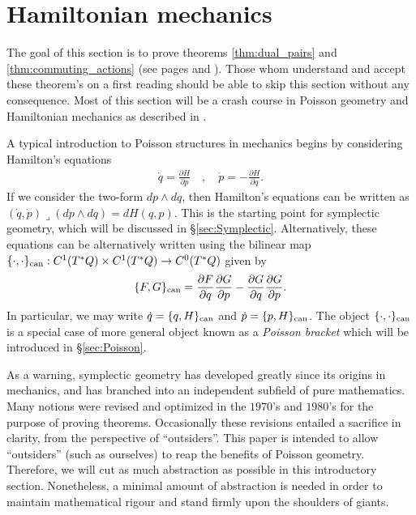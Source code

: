 \documentclass[12pt]{amsart}
\newcommand{\pder}[2]{\ensuremath{\frac{\partial #1}{\partial #2}}}
\begin{document}
\section{Hamiltonian mechanics}
\label{sec:Hamiltonian}
The goal of this section is to prove theorems \ref{thm:dual_pairs}
and \ref{thm:commuting_actions} (see pages \pageref{thm:dual_pairs} and \pageref{thm:commuting_actions}).
Those whom understand and accept these theorem's on a first reading
should be able to skip this section without any consequence.
Most of this section will be a crash course in Poisson geometry
and Hamiltonian mechanics as described in \cite{FOM,MandS,Weinstein1983}.

A typical introduction to Poisson structures in mechanics
begins by considering Hamilton's equations
\begin{align*}
  \dot{q} = \pder{H}{p} \quad, \quad  \dot{p} = - \pder{H}{q}.
\end{align*}
If we consider the two-form $dp \wedge dq$, then Hamilton's equations
can be written as $(\dot{q},\dot{p}) \lrcorner (dp \wedge dq) = dH(q,p)$.
This is the starting point for symplectic geometry, which
will be discussed in \S \ref{sec:Symplectic}.
Alternatively, these equations can be alternatively written using the bilinear map $\{ \cdot , \cdot \}_{\rm can} : C^1( T^*Q) \times C^1(T^*Q) \to C^0(T^*Q)$
given by
\begin{align*}
  \{ F , G \}_{\rm can} = \pder{F}{q}\pder{G}{p} - \pder{G}{q} \pder{G}{p}.
\end{align*}
In particular, we may write $\dot{q} = \{ q , H \}_{\rm can}$ and $\dot{p} = \{ p , H\}_{\rm can}$.
The object $\{ \cdot , \cdot \}_{\rm can}$ is a special case of more general
object known as a \emph{Poisson bracket} which will be introduced in
\S \ref{sec:Poisson}.

As a warning, symplectic geometry has developed greatly
since its origins in mechanics, and
has branched into an independent subfield of pure mathematics.
Many notions were revised and optimized in the $1970$'s and $1980$'s for
the purpose of proving theorems.
Occasionally these revisions entailed a sacrifice
in clarity, from the perspective of ``outsiders''.
This paper is intended to allow ``outsiders''
(such as ourselves) to reap the benefits of Poisson geometry.
Therefore, we will cut as much abstraction as possible in this introductory
section.
Nonetheless, a minimal amount of abstraction is needed in order to
maintain mathematical rigour and stand firmly upon the shoulders of giants.
\end{document}
